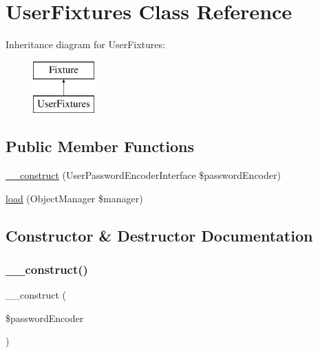 \hypertarget{class_app_1_1_data_fixtures_1_1_user_fixtures}{}\section{User\+Fixtures Class Reference}
\label{class_app_1_1_data_fixtures_1_1_user_fixtures}
Inheritance diagram for User\+Fixtures\+:\begin{figure}[H]
\begin{center}
\leavevmode
\includegraphics[height=2.000000cm]{class_app_1_1_data_fixtures_1_1_user_fixtures}
\end{center}
\end{figure}
\subsection*{Public Member Functions}
\begin{DoxyCompactItemize}
\item 
\mbox{\hyperlink{class_app_1_1_data_fixtures_1_1_user_fixtures_a9c0427612d0c8671c7cf13710a050cf1}{\+\_\+\+\_\+construct}} (User\+Password\+Encoder\+Interface \$password\+Encoder)
\item 
\mbox{\hyperlink{class_app_1_1_data_fixtures_1_1_user_fixtures_acb7929747e63056fbc9e2892615c18b2}{load}} (Object\+Manager \$manager)
\end{DoxyCompactItemize}


\subsection{Constructor \& Destructor Documentation}
\mbox{\label{class_app_1_1_data_fixtures_1_1_user_fixtures_a9c0427612d0c8671c7cf13710a050cf1}} 
\subsubsection{\texorpdfstring{\_\_construct()}{\_\_construct()}}
{\footnotesize\ttfamily \+\_\+\+\_\+construct (\begin{DoxyParamCaption}\item[{User\+Password\+Encoder\+Interface}]{\$password\+Encoder }\end{DoxyParamCaption})}

